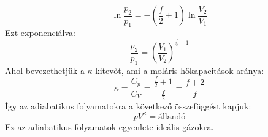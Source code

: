 \documentclass[a4paper,12pt]{article}
\begin{document}
\begin{equation}
    \ln{\frac{p_2}{p_1}} = - \left(\frac{f}{2} + 1\right) \ln{\frac{V_2}{V_1}}
\end{equation}
Ezt exponenciálva:
\begin{equation}
    \frac{p_2}{p_1} = \left(\frac{V_1}{V_2}\right)^{\frac{f}{2} + 1}
\end{equation}
Ahol bevezethetjük a $\kappa$ kitevőt, ami a moláris hőkapacitások aránya:
\begin{equation}
    \kappa = \frac{C_p}{C_V} = \frac{\frac{f}{2} + 1}{\frac{f}{2}} = \frac{f + 2}{f}
\end{equation}
Így az adiabatikus folyamatokra a következő összefüggést kapjuk:
\begin{equation}
    p V^{\kappa} = \text{állandó}
\end{equation}
Ez az adiabatikus folyamatok egyenlete ideális gázokra.
\end{document}
